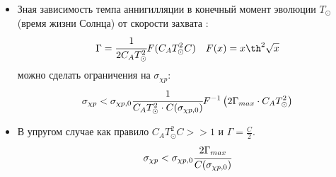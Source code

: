 \begin{itemize}
	\item Зная зависимость темпа аннигилляции в конечный момент эволюции $T_{\odot}$ (время жизни Солнца) от скорости захвата :
	 \begin{equation*}
	 	\Gamma =  \cfrac{1}{2 C_A T_{\odot}^2} F(C_A T_{\odot}^2 C) \quad F(x) = x\th^2{\sqrt{x}}
	 \end{equation*}
	 можно сделать ограничения на $\sigma_{\chi p}$:
	 \begin{equation}
	 	\sigma_{\chi p} < \sigma_{\chi p, 0} \cfrac{1}{C_A T_{\odot}^2 \cdot C(\sigma_{\chi p,0})} F^{-1}\left(	2\Gamma_{max} \cdot C_A T_{\odot}^2\right)
	 \end{equation}
	\item  В упругом случае как правило $C_AT_{\odot}^2 C >> 1$ и $\Gamma = \frac{C}{2}$.
	\begin{equation}
		\sigma_{\chi p} < \sigma_{\chi p, 0} \cfrac{2\Gamma_{max}}{C(\sigma_{\chi p,0})} 
	\end{equation}
\end{itemize}
